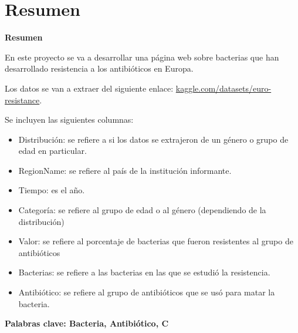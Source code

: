 \documentclass[../main.tex]{subfiles}
\begin{document}
\makeatletter
\renewenvironment{abstract}{%
    \if@twocolumn
      \section*{Resumen \\}%
    \else %
    \begin{flushright}
        {\filleft\Huge\bfseries\fontsize{48pt}{12}\selectfont Resumen\vspace{\z@}}%
        \end{flushright}
      \quotation
    \fi}
    {\if@twocolumn\else\endquotation\fi}
\makeatother
\makeatletter
\renewenvironment{abstract}{%
    \if@twocolumn
      \section*{Resumen \\}%
    \else %
    \begin{flushright}
        {\filleft\Huge\bfseries\fontsize{48pt}{12}\selectfont Resumen\vspace{\z@}}%
        \end{flushright}
      \quotation
    \fi}
    {\if@twocolumn\else\endquotation\fi}
\makeatother
\begin{abstract}

En este proyecto se va a desarrollar una página web sobre bacterias que han desarrollado resistencia a los antibióticos en Europa.

Los datos se van a extraer del siguiente enlace: \href{https://www.kaggle.com/datasets/samfenske/euro-resistance}{kaggle.com/datasets/euro-resistance}. 

Se incluyen las siguientes columnas:

\begin{itemize}
    \item Distribución: se refiere a si los datos se extrajeron de un género o grupo de edad en particular.
    \item RegionName: se refiere al país de la institución informante.
    \item Tiempo: es el año.
    \item  Categoría: se refiere al grupo de edad o al género (dependiendo de la distribución)
    \item  Valor: se refiere al porcentaje de bacterias que fueron resistentes al grupo de antibióticos
    \item Bacterias: se refiere a las bacterias en las que se estudió la resistencia.
    \item Antibiótico: se refiere al grupo de antibióticos que se usó para matar la bacteria.
\end{itemize}


\bfseries{\large{Palabras clave:}} Bacteria, Antibiótico, C

\end{abstract}
\end{document}
